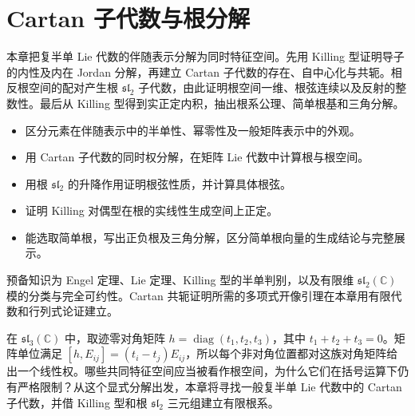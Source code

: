 
\chapter{Cartan 子代数与根分解}
\label{b5:ch:16}

\begin{chapterabstract}
	本章把复半单 Lie 代数的伴随表示分解为同时特征空间。先用 Killing 型证明导子的内性及内在 Jordan 分解，再建立 Cartan 子代数的存在、自中心化与共轭。相反根空间的配对产生根 \(\mathfrak{sl}_2\) 子代数，由此证明根空间一维、根弦连续以及反射的整数性。最后从 Killing 型得到实正定内积，抽出根系公理、简单根基和三角分解。
\end{chapterabstract}

\begin{learninggoals}
	\begin{itemize}
		\item 区分元素在伴随表示中的半单性、幂零性及一般矩阵表示中的外观。
		\item 用 Cartan 子代数的同时权分解，在矩阵 Lie 代数中计算根与根空间。
		\item 用根 \(\mathfrak{sl}_2\) 的升降作用证明根弦性质，并计算具体根弦。
		\item 证明 Killing 对偶型在根的实线性生成空间上正定。
		\item 能选取简单根，写出正负根及三角分解，区分简单根向量的生成结论与完整展示。
	\end{itemize}
	预备知识为 Engel 定理、Lie 定理、Killing 型的半单判别，以及有限维 \(\mathfrak{sl}_2(\mathbb C)\) 模的分类与完全可约性。Cartan 共轭证明所需的多项式开像引理在本章用有限代数和行列式论证建立。
\end{learninggoals}

在 \(\mathfrak{sl}_3(\mathbb C)\) 中，取迹零对角矩阵 \(h=\operatorname{diag}(t_1,t_2,t_3)\)，其中 \(t_1+t_2+t_3=0\)。矩阵单位满足 \([h,E_{ij}]=(t_i-t_j)E_{ij}\)，所以每个非对角位置都对这族对角矩阵给出一个线性权。哪些共同特征空间应当被看作根空间，为什么它们在括号运算下仍有严格限制？从这个显式分解出发，本章将寻找一般复半单 Lie 代数中的 Cartan 子代数，并借 Killing 型和根 \(\mathfrak{sl}_2\) 三元组建立有限根系。






